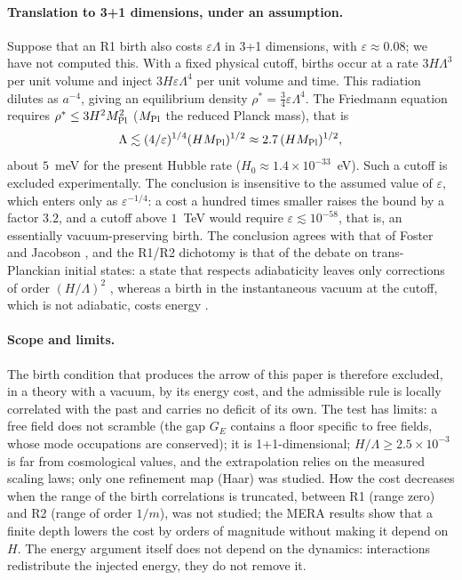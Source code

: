 \paragraph{Translation to 3+1 dimensions, under an assumption.} Suppose that an R1 birth also costs $\varepsilon\Lambda$ in 3+1 dimensions, with $\varepsilon\approx0.08$; we have not computed this. With a fixed physical cutoff, births occur at a rate $3H\Lambda^3$ per unit volume and inject $3H\varepsilon\Lambda^4$ per unit volume and time. This radiation dilutes as $a^{-4}$, giving an equilibrium density $\rho^\ast=\frac34\varepsilon\Lambda^4$. The Friedmann equation requires $\rho^\ast\le3H^2M_{\rm Pl}^2$ ($M_{\rm Pl}$ the reduced Planck mass), that is
\begin{equation}\label{eq:cutoff}
\Lambda\lesssim(4/\varepsilon)^{1/4}(HM_{\rm Pl})^{1/2}\approx2.7\,(HM_{\rm Pl})^{1/2},
\end{equation}
about $5$~meV for the present Hubble rate ($H_0\approx1.4\times10^{-33}$~eV). Such a cutoff is excluded experimentally. The conclusion is insensitive to the assumed value of $\varepsilon$, which enters only as $\varepsilon^{-1/4}$: a cost a hundred times smaller raises the bound by a factor $3.2$, and a cutoff above $1$~TeV would require $\varepsilon\lesssim10^{-58}$, that is, an essentially vacuum-preserving birth. The conclusion agrees with that of Foster and Jacobson \cite{FosterJacobson2004}, and the R1/R2 dichotomy is that of the debate on trans-Planckian initial states: a state that respects adiabaticity leaves only corrections of order $(H/\Lambda)^2$ \cite{KKLS2002}, whereas a birth in the instantaneous vacuum at the cutoff, which is not adiabatic, costs energy \cite{Danielsson2002,MartinBrandenberger2001}.

\paragraph{Scope and limits.} The birth condition that produces the arrow of this paper is therefore excluded, in a theory with a vacuum, by its energy cost, and the admissible rule is locally correlated with the past and carries no deficit of its own. The test has limits: a free field does not scramble (the gap $G_E$ contains a floor specific to free fields, whose mode occupations are conserved); it is 1+1-dimensional; $H/\Lambda\ge2.5\times10^{-3}$ is far from cosmological values, and the extrapolation relies on the measured scaling laws; only one refinement map (Haar) was studied. How the cost decreases when the range of the birth correlations is truncated, between R1 (range zero) and R2 (range of order $1/m$), was not studied; the MERA results show that a finite depth lowers the cost by orders of magnitude without making it depend on $H$. The energy argument itself does not depend on the dynamics: interactions redistribute the injected energy, they do not remove it.
